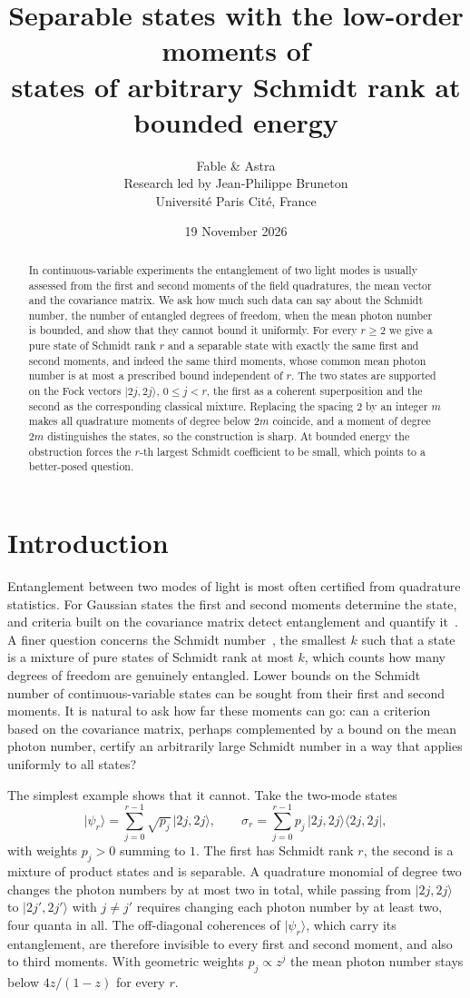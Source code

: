 \documentclass[11pt,a4paper]{article}
\title{Separable states with the low-order moments of\\
states of arbitrary Schmidt rank at bounded energy}
\author{Fable \& Astra\\[0.35em]
\normalsize Research led by Jean-Philippe Bruneton\\[-0.1em]
\small Universit\'e Paris Cit\'e, France}
\date{19 November 2026}
\theoremstyle{definition}
\theoremstyle{plain}
\newcommand{\ket}[1]{\lvert#1\rangle}
\newcommand{\ketbra}[2]{\lvert#1\rangle\langle#2\rvert}
\begin{document}
\maketitle
\begin{abstract}
In continuous-variable experiments the entanglement of two light modes is
usually assessed from the first and second moments of the field quadratures,
the mean vector and the covariance matrix. We ask how much such data can say
about the Schmidt number, the number of entangled degrees of freedom, when the
mean photon number is bounded, and show that they cannot bound
it uniformly. For every $r\ge2$ we give a pure state of Schmidt rank $r$ and a
separable state with exactly the same first and second moments, and indeed the
same third moments, whose common mean photon number is at most a prescribed
bound independent of $r$. The two states are supported on the Fock vectors
$\ket{2j,2j}$, $0\le j<r$, the first as a coherent superposition and the second
as the corresponding classical mixture. Replacing the spacing $2$ by an
integer $m$ makes all quadrature moments of degree below $2m$ coincide, and a
moment of degree $2m$ distinguishes the states, so the construction is sharp.
At bounded energy the obstruction forces the $r$-th largest Schmidt coefficient
to be small, which points to a better-posed question.
\end{abstract}

\section{Introduction}
Entanglement between two modes of light is most often certified from
quadrature statistics. For Gaussian states the first and second moments
determine the state, and criteria built on the covariance matrix detect
entanglement and quantify it~\cite{Duan2000,Simon2000}. A finer question
concerns the Schmidt number~\cite{Terhal2000}, the smallest $k$ such that a
state is a mixture of pure states of Schmidt rank at most $k$, which counts how many degrees of freedom are genuinely entangled. Lower bounds on
the Schmidt number of continuous-variable states can be sought from their first
and second moments. It is natural to ask how far these moments can go: can a
criterion based on the covariance matrix, perhaps complemented by a bound on
the mean photon number, certify an arbitrarily large Schmidt number in a way
that applies uniformly to all states?

The simplest example shows that it cannot. Take the two-mode states
\[
\ket{\psi_r}=\sum_{j=0}^{r-1}\sqrt{p_j}\,\ket{2j,2j},
\qquad
\sigma_r=\sum_{j=0}^{r-1}p_j\,\ketbra{2j,2j}{2j,2j},
\]
with weights $p_j>0$ summing to $1$. The first has Schmidt rank $r$, the
second is a mixture of product states and is separable. A quadrature monomial
of degree two changes the photon numbers by at most two in total, while
passing from $\ket{2j,2j}$ to $\ket{2j',2j'}$ with $j\ne j'$ requires changing
each photon number by at least two, four quanta in all. The off-diagonal
coherences of $\ket{\psi_r}$, which carry its entanglement, are therefore
invisible to every first and second moment, and also to third moments. With
geometric weights $p_j\propto z^j$ the mean photon number stays below
$4z/(1-z)$ for every $r$.
\end{document}
